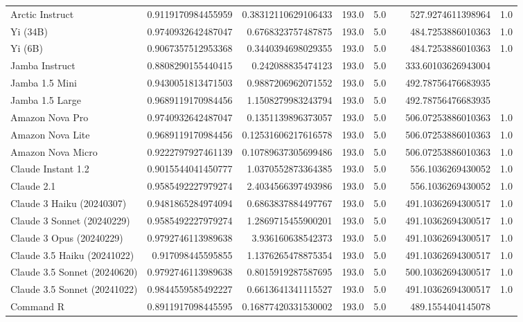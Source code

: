 \begin{table}[htp]
{\begin{tabular}{lrrrrrrr}
Arctic Instruct & 0.9119170984455959 & 0.38312110629106433 & 193.0 & 5.0 &  & 527.9274611398964 & 1.0 \\
Yi (34B) & 0.9740932642487047 & 0.6768323757487875 & 193.0 & 5.0 &  & 484.7253886010363 & 1.0 \\
Yi (6B) & 0.9067357512953368 & 0.3440394698029355 & 193.0 & 5.0 &  & 484.7253886010363 & 1.0 \\
Jamba Instruct & 0.8808290155440415 & 0.242088835474123 & 193.0 & 5.0 &  & 333.60103626943004 &  \\
Jamba 1.5 Mini & 0.9430051813471503 & 0.9887206962071552 & 193.0 & 5.0 &  & 492.78756476683935 &  \\
Jamba 1.5 Large & 0.9689119170984456 & 1.1508279983243794 & 193.0 & 5.0 &  & 492.78756476683935 &  \\
Amazon Nova Pro & 0.9740932642487047 & 0.1351139896373057 & 193.0 & 5.0 &  & 506.07253886010363 & 1.0 \\
Amazon Nova Lite & 0.9689119170984456 & 0.12531606217616578 & 193.0 & 5.0 &  & 506.07253886010363 & 1.0 \\
Amazon Nova Micro & 0.9222797927461139 & 0.10789637305699486 & 193.0 & 5.0 &  & 506.07253886010363 & 1.0 \\
Claude Instant 1.2 & 0.9015544041450777 & 1.0370552873364385 & 193.0 & 5.0 &  & 556.1036269430052 & 1.0 \\
Claude 2.1 & 0.9585492227979274 & 2.4034566397493986 & 193.0 & 5.0 &  & 556.1036269430052 & 1.0 \\
Claude 3 Haiku (20240307) & 0.9481865284974094 & 0.6863837884497767 & 193.0 & 5.0 &  & 491.10362694300517 & 1.0 \\
Claude 3 Sonnet (20240229) & 0.9585492227979274 & 1.2869715455900201 & 193.0 & 5.0 &  & 491.10362694300517 & 1.0 \\
Claude 3 Opus (20240229) & 0.9792746113989638 & 3.936160638542373 & 193.0 & 5.0 &  & 491.10362694300517 & 1.0 \\
Claude 3.5 Haiku (20241022) & 0.917098445595855 & 1.1376265478875354 & 193.0 & 5.0 &  & 491.10362694300517 & 1.0 \\
Claude 3.5 Sonnet (20240620) & 0.9792746113989638 & 0.8015919287587695 & 193.0 & 5.0 &  & 500.10362694300517 & 1.0 \\
Claude 3.5 Sonnet (20241022) & 0.9844559585492227 & 0.6613641341115527 & 193.0 & 5.0 &  & 491.10362694300517 & 1.0 \\
Command R & 0.8911917098445595 & 0.16877420331530002 & 193.0 & 5.0 &  & 489.1554404145078 &  \\

\end{tabular}}
\end{table}
